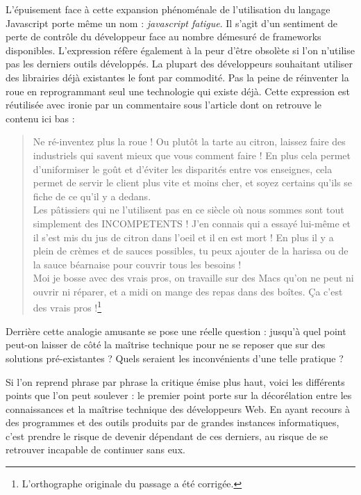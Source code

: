 \documentclass[a4paper,12pt,twoside]{book}
\begin{document}
L'épuisement face à cette expansion phénoménale de l'utilisation du langage Javascript porte même un nom : \textit{javascript fatigue}. Il s'agit d'un sentiment de perte de contrôle du développeur face au nombre démesuré de frameworks disponibles. L'expression réfère également à la peur d'être obsolète si l'on n'utilise pas les derniers outils développés.
La plupart des développeurs souhaitant utiliser des librairies déjà existantes le font par commodité. Pas la peine de \og réinventer la roue \fg en reprogrammant seul une technologie qui existe déjà. Cette expression est réutilisée avec ironie par un commentaire sous l'article dont on retrouve le contenu ici bas :

\begin{quote}
    Ne ré-inventez plus la roue ! Ou plutôt la tarte au citron, laissez faire des
industriels qui savent mieux que vous comment faire ! En plus cela permet
d'uniformiser le goût et d'éviter les disparités entre vos enseignes, cela
permet de servir le client plus vite et moins cher, et soyez certains qu'ils se
fiche de ce qu'il y a dedans.\\
Les pâtissiers qui ne l'utilisent pas en ce siècle où nous sommes sont tout simplement des INCOMPETENTS ! J'en connais
qui a essayé lui-même et il s'est mis du jus de citron dans l'oeil et il en est
mort ! En plus il y a plein de crèmes et de sauces possibles, tu peux ajouter
de la harissa ou de la sauce béarnaise pour couvrir tous les besoins !\\ Moi je
bosse avec des vrais pros, on travaille sur des Macs qu'on ne peut ni ouvrir
ni réparer, et a midi on mange des repas dans des boîtes. Ça c'est des vrais
pros !\footnote{L'orthographe originale du passage a été corrigée.}
\end{quote}

Derrière cette analogie amusante se pose une réelle question : jusqu'à quel point peut-on laisser de côté la maîtrise technique pour ne se reposer que sur des solutions pré-existantes ? Quels seraient les inconvénients d'une telle pratique ?

Si l'on reprend phrase par phrase la critique émise plus haut, voici les différents points que l'on peut soulever : le premier point porte sur la décorélation entre les connaissances et la maîtrise technique des développeurs Web. En ayant recours à des programmes et des outils produits par de grandes instances informatiques, c'est prendre le risque de devenir dépendant de ces derniers, au risque de se retrouver incapable de continuer sans eux.
\end{document}
